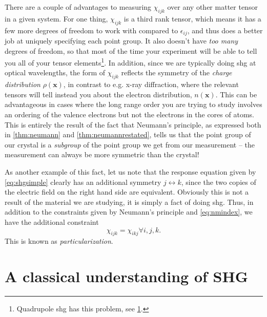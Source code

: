 There are a couple of advantages to measuring $\chi_{ijk}$ over any other matter tensor in a given system.
For one thing, $\chi_{ijk}$ is a third rank tensor, which means it has a few more degrees of freedom to work with compared to $\epsilon_{ij}$, and thus does a better job at uniquely specifying each point group.
It also doesn't have \emph{too many} degrees of freedom, so that most of the time your experiment will be able to tell you all of your tensor elements\footnote{Quadrupole \gls{shg} has this problem, see \cref{sec:manyshgterms}.}.
In addition, since we are typically doing \gls{shg} at optical wavelengths, the form of $\chi_{ijk}$ reflects the symmetry of the \emph{charge distribution} $\rho(\bm{x})$, in contrast to e.g. x-ray diffraction, where the relevant tensors will tell instead you about the electron distribution, $n(\bm{x})$.
This can be advantageous in cases where the long range order you are trying to study involves an ordering of the valence electrons but not the electrons in the cores of atoms.
This is entirely the result of the fact that Neumann's principle, as expressed both in \cref{thm:neumann} and \cref{thm:neumannrestated}, tells us that the point group of our crystal is a \emph{subgroup} of the point group we get from our measurement -- the measurement can always be more symmetric than the crystal!

As another example of this fact, let us note that the response equation given by \cref{eq:shgsimple} clearly has an additional symmetry $j \leftrightarrow k$, since the two copies of the electric field on the right hand side are equivalent.
Obviously this is not a result of the material we are studying, it is simply a fact of doing \gls{shg}.
Thus, in addition to the constraints given by Neumann's principle and \cref{eq:nmindex}, we have the additional constraint
\begin{equation}
\chi_{ijk} = \chi_{ikj} \forall i,j,k.
\end{equation}
This is known as \emph{particularization}\citep{birss}.

\section{A classical understanding of SHG}\label{sec:manyshgterms}

